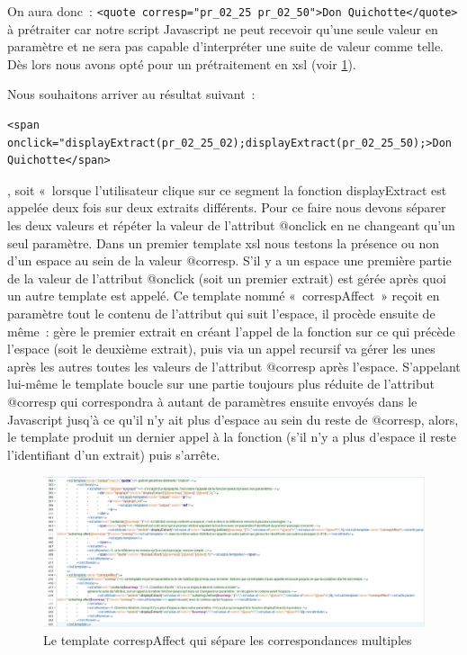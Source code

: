 \documentclass[12pt, a4paper]{article}
\begin{document}
On aura donc~: \verb|<quote corresp="pr_02_25 pr_02_50">Don Quichotte</quote>| à prétraiter car notre script Javascript ne peut recevoir qu'une seule valeur en paramètre et ne sera pas capable d'interpréter une suite de valeur comme telle. Dès lors nous avons opté pour un prétraitement en xsl (voir \ref{fig:corrspAfect}).


Nous souhaitons arriver au résultat suivant~: \begin{verbatim}<span onclick="displayExtract(pr_02_25_02);displayExtract(pr_02_25_50);>Don
Quichotte</span>\end{verbatim}, soit «~lorsque l'utilisateur clique sur ce segment la fonction displayExtract est appelée deux fois sur deux extraits différents. Pour ce faire nous devons séparer les deux valeurs et répéter la valeur de l'attribut @onclick en ne changeant qu'un seul paramètre. Dans un premier template xsl nous testons la présence ou non d'un espace au sein de la valeur @corresp. S'il y a un espace une première partie de la valeur de l'attribut @onclick (soit un premier extrait) est gérée après quoi un autre template est appelé. Ce template nommé «~correspAffect~» reçoit en paramètre tout le contenu de l'attribut qui suit l'espace, il procède ensuite de même~: gère le premier extrait en créant l'appel de la fonction sur ce qui précède l'espace (soit le deuxième extrait), puis via un appel recursif va gérer les unes après les autres toutes les valeurs de l'attribut @corresp après l'espace. S'appelant lui-même le template boucle sur une partie toujours plus réduite de l'attribut @corresp qui correspondra à autant de paramètres ensuite envoyés dans le Javascript jusq'à ce qu'il n'y ait plus d'espace au sein du reste de @corresp, alors, le template produit un dernier appel à la fonction (s'il n'y a plus d'espace il reste l'identifiant d'un extrait) puis s'arrête.

\begin{figure}[H]
    \centering
    \includegraphics[scale=0.3]{img/screen_quote_xsl.jpg}
    \caption{Le template correspAffect qui sépare les correspondances multiples}
    \label{fig:corrspAfect}
\end{figure}
\end{document}
